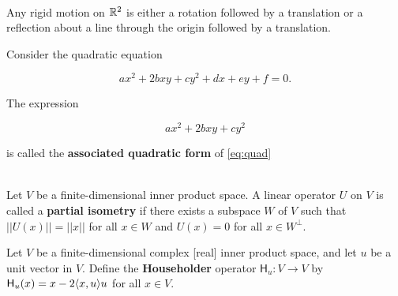 \begin{corollary}
	\hfill\\
	Any rigid motion on $\mathbb{R}^2$ is either a rotation followed by a translation or a reflection about a line through the origin followed by a translation.
\end{corollary}

\begin{definition}
	Consider the quadratic equation

	\begin{equation}\label{eq:quad}
		ax^2 + 2bxy + cy^2 +dx + ey + f = 0.
	\end{equation}

	The expression

	\[ax^2 + 2bxy + cy^2\]

	is called the \textbf{associated quadratic form} of \eqref{eq:quad}
\end{definition}

\begin{definition}
	\hfill\\
	Let $V$ be a finite-dimensional inner product space. A linear operator $U$ on $V$ is called a \textbf{partial isometry} if there exists a subspace $W$ of $V$ such that $||U(x)|| = ||x||$ for all $x \in W$ and $U(x) = 0$ for all $x \in W^\perp$.
\end{definition}

\begin{definition}
	Let $V$ be a finite-dimensional complex [real] inner product space, and let $u$ be a unit vector in $V$. Define the \textbf{Householder} operator $\mathsf{H}_u: V \to V$ by $\mathsf{H}_u(x) = x-2\langle x,u\rangle u$ for all $x \in V$.
\end{definition}
